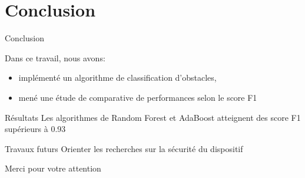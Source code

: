 \documentclass[usenames,dvipsnames]{beamer}
\begin{document}
\section{Conclusion}
\begin{frame}{Conclusion}

Dans ce travail, nous avons:
\begin{itemize}

\item implémenté un algorithme de classification d’obstacles,

\item mené une étude de comparative de performances selon le score F1

\end{itemize} 

\medskip
\begin{block}{Résultats}
Les algorithmes de Random Forest et AdaBoost atteignent des score F1 supérieurs à 0.93
\end{block}


\begin{block}{Travaux futurs}
Orienter les recherches sur la sécurité du dispositif
\end{block}


\end{frame}

\begin{frame}
\begin{center}

\begin{Huge}
\color{Blue}Merci pour votre attention
\end{Huge}
\end{center}

\end{frame}
\end{document}
